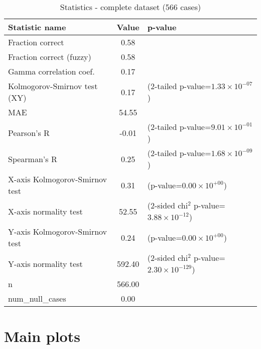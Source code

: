 \documentclass[10pt, letterpaper, oneside, titlepage, landscape]{scrreprt}
\begin{document}
\begin{table}[H]\begin{center}
\begin{tabular}{ l S[table-format=3.2] l}
Statistic name & {Value} & p-value\\
\hline
Fraction correct & 0.58 & \\
Fraction correct (fuzzy) & 0.58 & \\
Gamma correlation coef. & 0.17 & \\
Kolmogorov-Smirnov test (XY) & 0.17 & (2-tailed p-value=$1.33\times10^{-07}$)\\
MAE & 54.55 & \\
Pearson's R & -0.01 & (2-tailed p-value=$9.01\times10^{-01}$)\\
Spearman's R & 0.25 & (2-tailed p-value=$1.68\times10^{-09}$)\\
X-axis Kolmogorov-Smirnov test & 0.31 & (p-value=$0.00\times10^{+00}$)\\
X-axis normality test & 52.55 & (2-sided chi$^{2}$ p-value=$3.88\times10^{-12}$)\\
Y-axis Kolmogorov-Smirnov test & 0.24 & (p-value=$0.00\times10^{+00}$)\\
Y-axis normality test & 592.40 & (2-sided chi$^{2}$ p-value=$2.30\times10^{-129}$)\\
n & 566.00 & \\
num\_null\_cases & 0.00 & \\
\end{tabular}
\caption{Statistics - complete dataset (566 cases)}
\end{center}\end{table}



\clearpage

\section{Main plots}
\end{document}
